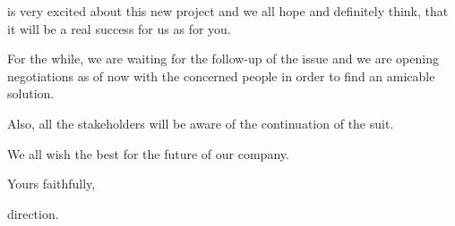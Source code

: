 \moldco is very excited about this new project and we all hope and definitely think, that it will be a real success for us as for you. 

For the while, we are waiting for the follow-up of the issue and we are opening negotiations as of now with the concerned people in order to find an amicable solution. 

Also, all the stakeholders will be aware of the continuation of the suit. 

\bigskip

We all wish the best for the future of our company. 

\bigskip

Yours faithfully, 

\moldco direction. 